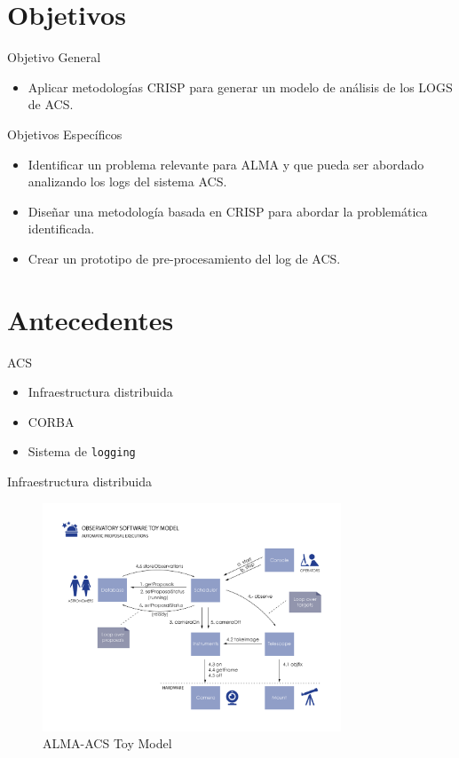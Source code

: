 \documentclass[11pt]{beamer}
\begin{document}
\section{Objetivos}
\begin{frame}{Objetivo General}
\begin{itemize}
	\item Aplicar metodologías CRISP para generar un modelo de análisis de los LOGS de ACS.
\end{itemize}	
\end{frame}

\begin{frame}{Objetivos Específicos}
	

\begin{itemize}	
	\item Identificar un problema relevante para ALMA y que pueda ser abordado analizando los logs del sistema ACS.
	\item Diseñar una metodología basada en CRISP para abordar la problemática identificada.
	\item Crear un prototipo de pre-procesamiento del log de ACS.
\end{itemize}

\end{frame}
\section{Antecedentes}

\begin{frame}{ACS}
	\begin{itemize}
		\item Infraestructura distribuida
		\item CORBA
		\item Sistema de \texttt{logging}
	\end{itemize}
\end{frame}

\begin{frame}{Infraestructura distribuida}
\begin{figure}
\centering
	\includegraphics[height=6.8cm]{alma_toy_model}
\caption{ALMA-ACS Toy Model}
\end{figure}
\end{frame}
\end{document}
